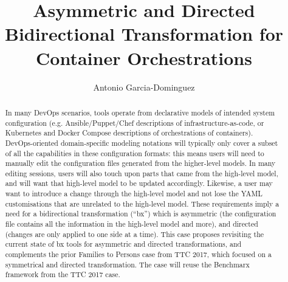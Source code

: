 \documentclass[sigconf,review]{acmart}
\begin{document}
\title{Asymmetric and Directed Bidirectional Transformation for Container Orchestrations}

\author{Antonio Garcia-Dominguez}

\renewcommand{\shortauthors}{Garcia-Dominguez}

\begin{abstract}
  In many DevOps scenarios, tools operate from declarative models of intended
  system configuration (e.g. Ansible/Puppet/Chef descriptions of
  infrastructure-as-code, or Kubernetes and Docker Compose descriptions of
  orchestrations of containers). DevOps-oriented domain-specific modeling
  notations will typically only cover a subset of all the capabilities in these
  configuration formats: this means users will need to manually edit the
  configuration files generated from the higher-level models. In many editing
  sessions, users will also touch upon parts that came from the high-level
  model, and will want that high-level model to be updated accordingly.
  Likewise, a user may want to introduce a change through the high-level model
  and not lose the YAML customisations that are unrelated to the high-level
  model. These requirements imply a need for a bidirectional transformation
  (``bx'') which is asymmetric (the configuration file contains all the
  information in the high-level model and more), and directed (changes are only
  applied to one side at a time). This case proposes revisiting the current
  state of bx tools for asymmetric and directed transformations, and complements
  the prior Families to Persons case from TTC 2017, which focused on a
  symmetrical and directed transformation. The case will reuse the Benchmarx
  framework from the TTC 2017 case.
\end{abstract}
\end{document}
